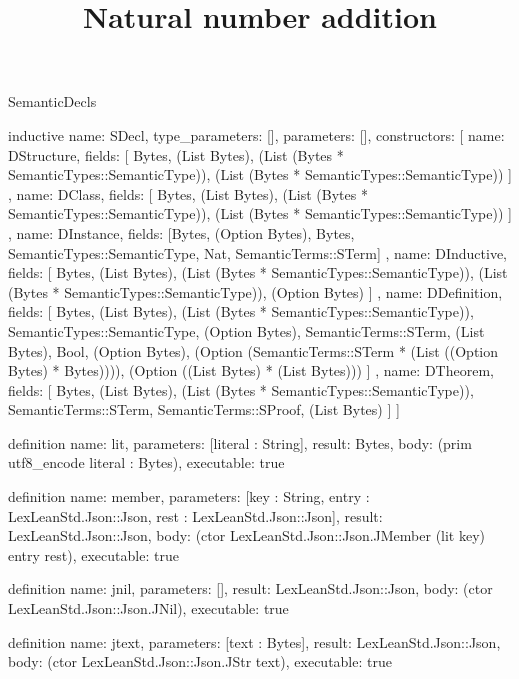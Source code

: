 \begin{lexlean}{SemanticDecls}
\title{Natural number addition}
\begin{semanticmodule}
inductive{
  name: SDecl,
  type_parameters: [],
  parameters: [],
  constructors: [
    {
      name: DStructure,
      fields: [
        Bytes,
        (List Bytes),
        (List (Bytes * SemanticTypes::SemanticType)),
        (List (Bytes * SemanticTypes::SemanticType))
      ]
    },
    {
      name: DClass,
      fields: [
        Bytes,
        (List Bytes),
        (List (Bytes * SemanticTypes::SemanticType)),
        (List (Bytes * SemanticTypes::SemanticType))
      ]
    },
    {
      name: DInstance,
      fields: [Bytes, (Option Bytes), Bytes, SemanticTypes::SemanticType, Nat, SemanticTerms::STerm]
    },
    {
      name: DInductive,
      fields: [
        Bytes,
        (List Bytes),
        (List (Bytes * SemanticTypes::SemanticType)),
        (List (Bytes * SemanticTypes::SemanticType)),
        (Option Bytes)
      ]
    },
    {
      name: DDefinition,
      fields: [
        Bytes,
        (List Bytes),
        (List (Bytes * SemanticTypes::SemanticType)),
        SemanticTypes::SemanticType,
        (Option Bytes),
        SemanticTerms::STerm,
        (List Bytes),
        Bool,
        (Option Bytes),
        (Option (SemanticTerms::STerm * (List ((Option Bytes) * Bytes)))),
        (Option ((List Bytes) * (List Bytes)))
      ]
    },
    {
      name: DTheorem,
      fields: [
        Bytes,
        (List Bytes),
        (List (Bytes * SemanticTypes::SemanticType)),
        SemanticTerms::STerm,
        SemanticTerms::SProof,
        (List Bytes)
      ]
    }
  ]
}

definition{
  name: lit,
  parameters: [literal : String],
  result: Bytes,
  body: (prim utf8_encode literal : Bytes),
  executable: true
}

definition{
  name: member,
  parameters: [key : String, entry : LexLeanStd.Json::Json, rest : LexLeanStd.Json::Json],
  result: LexLeanStd.Json::Json,
  body: (ctor LexLeanStd.Json::Json.JMember (lit key) entry rest),
  executable: true
}

definition{
  name: jnil,
  parameters: [],
  result: LexLeanStd.Json::Json,
  body: (ctor LexLeanStd.Json::Json.JNil),
  executable: true
}

definition{
  name: jtext,
  parameters: [text : Bytes],
  result: LexLeanStd.Json::Json,
  body: (ctor LexLeanStd.Json::Json.JStr text),
  executable: true
}


\end{semanticmodule}
\end{lexlean}
